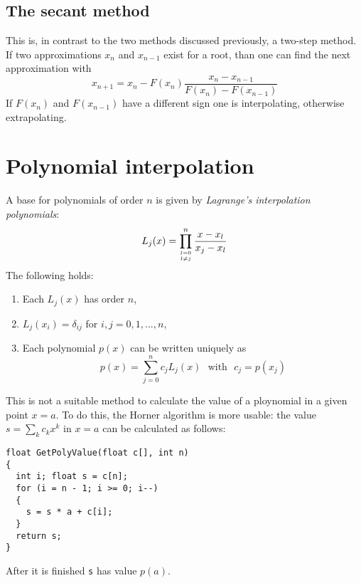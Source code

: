 \subsection{The secant method}
This is, in contrast to the two methods discussed previously, a two-step
method. If two approximations $x_n$ and $x_{n-1}$ exist for a root, than
one can find the next approximation with
\[
x_{n+1}=x_n-F(x_n)\frac{x_n-x_{n-1}}{F(x_n)-F(x_{n-1})}
\]
If $F(x_n)$ and $F(x_{n-1})$ have a different sign one is interpolating,
otherwise extrapolating.

\section{Polynomial interpolation}
A base for polynomials of order $n$ is given by {\it Lagrange's interpolation
polynomials}:
\[
L_j(x)=\prod_{{l=0}\atop{l\neq j}}^n\frac{x-x_l}{x_j-x_l}
\]
The following holds:
\begin{enumerate}
\item Each $L_j(x)$ has order $n$,
\item $L_j(x_i)=\delta_{ij}$ for $i,j=0,1,...,n$,
\item Each polynomial $p(x)$ can be written uniquely as
\[
p(x)=\sum_{j=0}^n c_jL_j(x)~~~\mbox{with}~~~c_j=p(x_j)
\]
\end{enumerate}
This is not a suitable method to calculate the value of a ploynomial in a
given point $x=a$. To do this, the Horner algorithm is more usable: the
value $s=\sum_k c_kx^k$ in $x=a$ can be calculated as follows:
\begin{verbatim}
float GetPolyValue(float c[], int n)
{
  int i; float s = c[n];
  for (i = n - 1; i >= 0; i--)
  {
    s = s * a + c[i];
  }
  return s;
}
\end{verbatim}
After it is finished {\tt s} has value $p(a)$.

